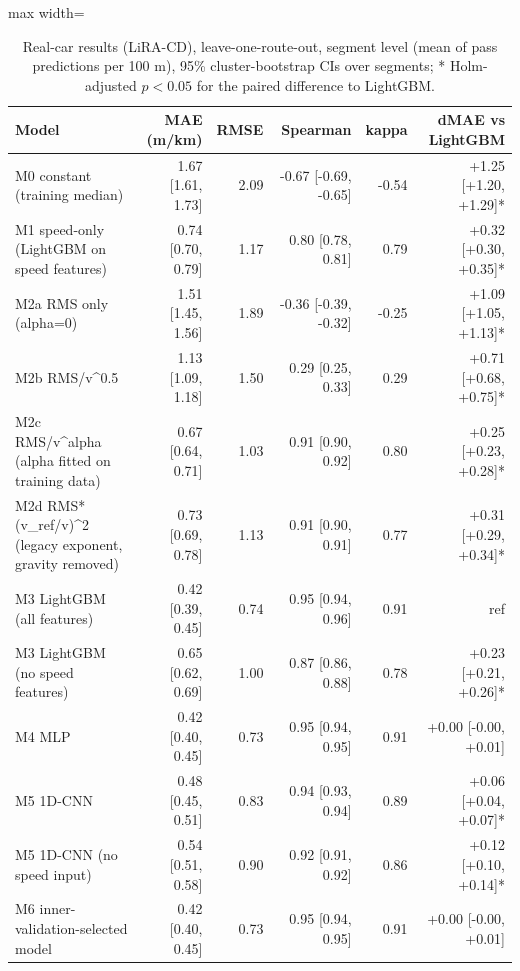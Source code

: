 \begin{table}[!htbp]
\centering
\footnotesize
\caption{Real-car results (LiRA-CD), leave-one-route-out, segment level (mean of pass predictions per 100 m), 95\% cluster-bootstrap CIs over segments; * Holm-adjusted $p<0.05$ for the paired difference to LightGBM.}
\label{tab:baselines}
\begin{adjustbox}{max width=\columnwidth}
\begin{tabular}{lrrrrr}
\toprule
\textbf{Model} & \textbf{MAE (m/km)} & \textbf{RMSE} & \textbf{Spearman} & \textbf{kappa} & \textbf{dMAE vs LightGBM} \\
\midrule
M0 constant (training median) & 1.67 [1.61, 1.73] & 2.09 & -0.67 [-0.69, -0.65] & -0.54 & +1.25 [+1.20, +1.29]* \\
M1 speed-only (LightGBM on speed features) & 0.74 [0.70, 0.79] & 1.17 & 0.80 [0.78, 0.81] & 0.79 & +0.32 [+0.30, +0.35]* \\
M2a RMS only (alpha=0) & 1.51 [1.45, 1.56] & 1.89 & -0.36 [-0.39, -0.32] & -0.25 & +1.09 [+1.05, +1.13]* \\
M2b RMS/v\textasciicircum{}0.5 & 1.13 [1.09, 1.18] & 1.50 & 0.29 [0.25, 0.33] & 0.29 & +0.71 [+0.68, +0.75]* \\
M2c RMS/v\textasciicircum{}alpha (alpha fitted on training data) & 0.67 [0.64, 0.71] & 1.03 & 0.91 [0.90, 0.92] & 0.80 & +0.25 [+0.23, +0.28]* \\
M2d RMS*(v\_ref/v)\textasciicircum{}2 (legacy exponent, gravity removed) & 0.73 [0.69, 0.78] & 1.13 & 0.91 [0.90, 0.91] & 0.77 & +0.31 [+0.29, +0.34]* \\
M3 LightGBM (all features) & 0.42 [0.39, 0.45] & 0.74 & 0.95 [0.94, 0.96] & 0.91 & ref \\
M3 LightGBM (no speed features) & 0.65 [0.62, 0.69] & 1.00 & 0.87 [0.86, 0.88] & 0.78 & +0.23 [+0.21, +0.26]* \\
M4 MLP & 0.42 [0.40, 0.45] & 0.73 & 0.95 [0.94, 0.95] & 0.91 & +0.00 [-0.00, +0.01] \\
M5 1D-CNN & 0.48 [0.45, 0.51] & 0.83 & 0.94 [0.93, 0.94] & 0.89 & +0.06 [+0.04, +0.07]* \\
M5 1D-CNN (no speed input) & 0.54 [0.51, 0.58] & 0.90 & 0.92 [0.91, 0.92] & 0.86 & +0.12 [+0.10, +0.14]* \\
M6 inner-validation-selected model & 0.42 [0.40, 0.45] & 0.73 & 0.95 [0.94, 0.95] & 0.91 & +0.00 [-0.00, +0.01] \\
\bottomrule
\end{tabular}
\end{adjustbox}
\end{table}
